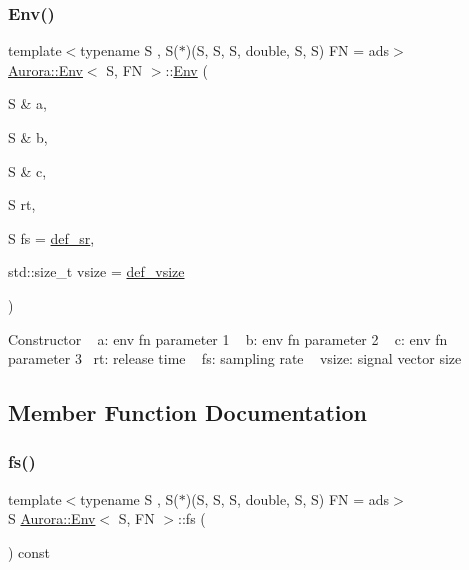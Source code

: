 \subsubsection{\texorpdfstring{Env()}{Env()}\hspace{0.1cm}{\footnotesize\ttfamily [2/2]}}
{\footnotesize\ttfamily template$<$typename S , S($\ast$)(\+S, S, S, double, S, S) FN = ads$>$ \\
\hyperlink{class_aurora_1_1_env}{Aurora\+::\+Env}$<$ S, FN $>$\+::\hyperlink{class_aurora_1_1_env}{Env} (\begin{DoxyParamCaption}\item[{S \&}]{a,  }\item[{S \&}]{b,  }\item[{S \&}]{c,  }\item[{S}]{rt,  }\item[{S}]{fs = {\ttfamily \hyperlink{namespace_aurora_ad49263d809bea98dd422e95bc91bc03e}{def\+\_\+sr}},  }\item[{std\+::size\+\_\+t}]{vsize = {\ttfamily \hyperlink{namespace_aurora_afaaddf667a06e7ce23c667a8b7295263}{def\+\_\+vsize}} }\end{DoxyParamCaption})\hspace{0.3cm}{\ttfamily [inline]}}

Constructor ~\newline
a\+: env fn parameter 1 ~\newline
b\+: env fn parameter 2 ~\newline
c\+: env fn parameter 3~\newline
rt\+: release time ~\newline
fs\+: sampling rate ~\newline
vsize\+: signal vector size 

\subsection{Member Function Documentation}
\mbox{\label{class_aurora_1_1_env_a8b83ca686cce4fc31b03b1de847bc062}} 
\subsubsection{\texorpdfstring{fs()}{fs()}}
{\footnotesize\ttfamily template$<$typename S , S($\ast$)(\+S, S, S, double, S, S) FN = ads$>$ \\
S \hyperlink{class_aurora_1_1_env}{Aurora\+::\+Env}$<$ S, FN $>$\+::fs (\begin{DoxyParamCaption}{ }\end{DoxyParamCaption}) const\hspace{0.3cm}{\ttfamily [inline]}}

